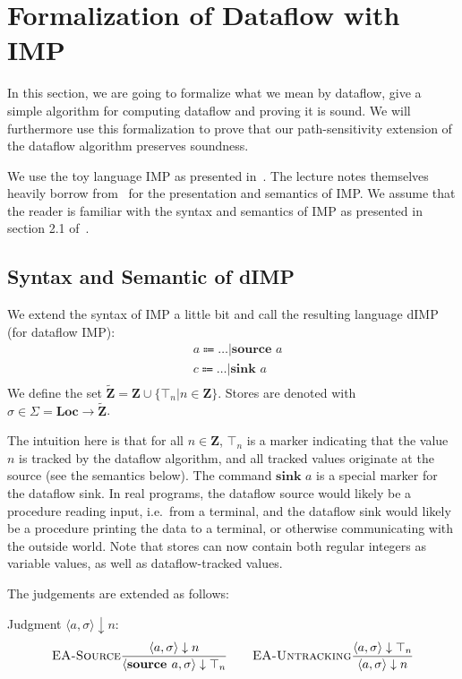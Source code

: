 \section{Formalization of Dataflow with IMP}

In this section, we are going to formalize what we mean by dataflow,
give a simple algorithm for computing dataflow and proving it is sound.
We will furthermore use this formalization to prove that our
path-sensitivity extension of the dataflow algorithm preserves soundness.

We use the toy language IMP as presented in~\cite{sat}.
The lecture notes themselves heavily borrow from~\cite{fsopl} for the
presentation and semantics of IMP.
We assume that the reader is familiar with the syntax and semantics of IMP
as presented in section 2.1 of~\cite{sat}.

\subsection{Syntax and Semantic of dIMP}
We extend the syntax of IMP a little bit
and call the resulting language dIMP (for dataflow IMP):
\begin{align*}
    &a \Coloneqq \dots | \textbf{source } a\\
    &c \Coloneqq \dots | \textbf{sink } a\\
\end{align*}
We define the set $\tilde{\textbf{Z}} = \textbf{Z} \cup \{\top_n | n \in \textbf{Z}\}$.
Stores are denoted with $\sigma \in \Sigma = \textbf{Loc} \to \tilde{\textbf{Z}}$.


The intuition here is that for all $n \in \textbf{Z}$, $\top_n$
is a marker indicating that the value $n$ is tracked by the dataflow algorithm,
and all tracked values originate at the source (see the semantics below).
The command $\textbf{sink } a$ is a special marker for the dataflow sink.
In real programs, the dataflow source would likely be a procedure reading input,
i.e.\ from a terminal, and the dataflow sink would likely be a procedure 
printing the data to a terminal, or otherwise communicating with the outside world.
Note that stores can now contain both regular integers as variable values,
as well as dataflow-tracked values.

The judgements are extended as follows:

Judgment $\langle a, \sigma \rangle \downarrow n$:
\begin{align*}
    \textsc{EA-Source}\frac{\displaystyle \langle a, \sigma \rangle \downarrow n}{\displaystyle \langle \textbf{source }a, \sigma \rangle \downarrow \top_n}
    \qquad     
    \textsc{EA-Untracking}\frac{\displaystyle \langle a, \sigma \rangle \downarrow \top_n}{\displaystyle \langle a, \sigma \rangle \downarrow n}
\end{align*}




